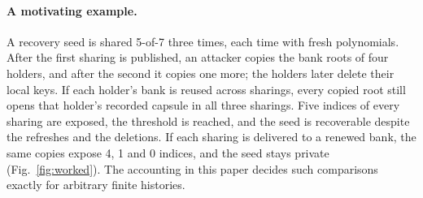 \documentclass[pdflatex,sn-mathphys-num]{sn-jnl}%
\theoremstyle{plain}
\theoremstyle{definition}
\begin{document}
\paragraph{A motivating example.}
A recovery seed is shared 5-of-7 three times, each time with fresh polynomials. After the first sharing is published, an attacker copies the bank roots of four holders, and after the second it copies one more; the holders later delete their local keys. If each holder's bank is reused across sharings, every copied root still opens that holder's recorded capsule in all three sharings. Five indices of every sharing are exposed, the threshold is reached, and the seed is recoverable despite the refreshes and the deletions. If each sharing is delivered to a renewed bank, the same copies expose 4, 1 and 0 indices, and the seed stays private (Fig.~\ref{fig:worked}). The accounting in this paper decides such comparisons exactly for arbitrary finite histories.
\end{document}
